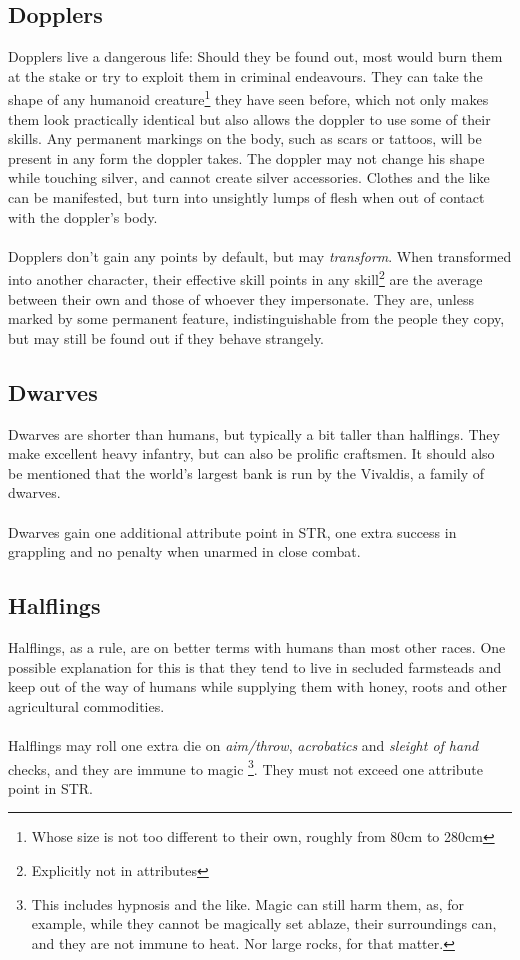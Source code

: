 \documentclass[parskip=full,11pt,%
footheight=38pt]{scrreport}
\begin{document}
\subsection{Dopplers}
Dopplers live a dangerous life: Should they be found out, most would burn them at the stake or try to exploit them in criminal endeavours.
They can take the shape of any humanoid creature\footnote{Whose size is not too different to their own, roughly from 80cm to 280cm} they have seen before, which not only makes them look practically identical but also allows the
doppler to use some of their skills. Any permanent markings on the body, such as scars or tattoos, will be present in any form the doppler takes.
The doppler may not change his shape while touching silver, and cannot create silver accessories. Clothes and the like can be manifested,
but turn into unsightly lumps of flesh when out of contact with the doppler's body.
\\\\
Dopplers don't gain any points by default, but may \textit{transform}. When transformed into another character, their effective skill points in
any skill\footnote{Explicitly not in attributes} are the average between their own and those of whoever they impersonate. They are, unless marked
by some permanent feature, indistinguishable from the people they copy, but may still be found out if they behave strangely.

\subsection{Dwarves}
Dwarves are shorter than humans, but typically a bit taller than halflings. They make excellent
heavy infantry, but can also be prolific craftsmen. It should also be mentioned that the world's
largest bank is run by the Vivaldis, a family of dwarves.
\\\\
Dwarves gain one additional attribute point in STR, one extra success in grappling and no penalty
when unarmed in close combat.

\subsection{Halflings}
Halflings, as a rule, are on better terms with humans than most other races. One possible explanation for this is that they tend to live
in secluded farmsteads and keep out of the way of humans while supplying them with honey, roots and other agricultural commodities.
\\\\
Halflings may roll one extra die on \textit{aim/throw}, \textit{acrobatics} and \textit{sleight of hand} checks, and they are immune to magic%
\footnote{This includes hypnosis and the like. Magic can still harm them, as, for example, while they cannot be magically set ablaze, their surroundings
	can, and they are not immune to heat. Nor large rocks, for that matter.}. They must not exceed one attribute point in STR.
\end{document}
